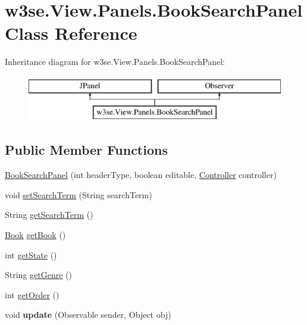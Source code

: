 \hypertarget{classw3se_1_1_view_1_1_panels_1_1_book_search_panel}{\section{w3se.\-View.\-Panels.\-Book\-Search\-Panel Class Reference}
\label{classw3se_1_1_view_1_1_panels_1_1_book_search_panel}
}
Inheritance diagram for w3se.\-View.\-Panels.\-Book\-Search\-Panel\-:\begin{figure}[H]
\begin{center}
\leavevmode
\includegraphics[height=2.000000cm]{classw3se_1_1_view_1_1_panels_1_1_book_search_panel}
\end{center}
\end{figure}
\subsection*{Public Member Functions}
\begin{DoxyCompactItemize}
\item 
\hyperlink{classw3se_1_1_view_1_1_panels_1_1_book_search_panel_a565be5bd0120e834c603bc9657ea5bbb}{Book\-Search\-Panel} (int header\-Type, boolean editable, \hyperlink{interfacew3se_1_1_controller_1_1_controller}{Controller} controller)
\item 
void \hyperlink{classw3se_1_1_view_1_1_panels_1_1_book_search_panel_ac4414ad29d6c13f2fec232a5f103bd04}{set\-Search\-Term} (String search\-Term)
\item 
String \hyperlink{classw3se_1_1_view_1_1_panels_1_1_book_search_panel_a7bde5b60b1b960d3a99b62f5a4291716}{get\-Search\-Term} ()
\item 
\hyperlink{classw3se_1_1_model_1_1_base_1_1_book}{Book} \hyperlink{classw3se_1_1_view_1_1_panels_1_1_book_search_panel_a2fed30a73454e240c4bebd3ea7fe7fc8}{get\-Book} ()
\item 
int \hyperlink{classw3se_1_1_view_1_1_panels_1_1_book_search_panel_af080817c536c1ceb48f9d3b9e6c90d85}{get\-State} ()
\item 
String \hyperlink{classw3se_1_1_view_1_1_panels_1_1_book_search_panel_aa102152bfcad83b7572f95e34bed4a78}{get\-Genre} ()
\item 
int \hyperlink{classw3se_1_1_view_1_1_panels_1_1_book_search_panel_a5fb13005d6c7c297d158536623128a4d}{get\-Order} ()
\item 
\hypertarget{classw3se_1_1_view_1_1_panels_1_1_book_search_panel_aa4f6403de6cbb2371a5171724d2bf23b}{void {\bfseries update} (Observable sender, Object obj)}\label{classw3se_1_1_view_1_1_panels_1_1_book_search_panel_aa4f6403de6cbb2371a5171724d2bf23b}

\end{DoxyCompactItemize}
